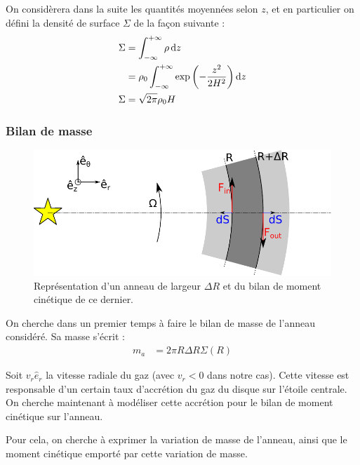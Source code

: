 \bigskip

On considèrera dans la suite les quantités moyennées selon $z$, et en particulier on défini la densité de surface $\Sigma$ de la façon suivante : 
\begin{align}
\Sigma &= \int_{-\infty}^{+\infty} \rho \dif z\nonumber\\
&=\rho_0 \int_{-\infty}^{+\infty}  \exp\left(-\frac{z^2}{2H^2}\right)\dif z\nonumber\\
\Sigma &= \sqrt{2\pi}\rho_0 H\label{eq:surface-to-volume}
\end{align}


\subsubsection{Bilan de masse}
\begin{figure}[htbp]
\centering
\includegraphics[width=0.7\linewidth]{figure/disk_ring.pdf}
\caption[Bilan de moment cinétique d'un anneau d'épaisseur $\Delta R$.]{Représentation d'un anneau de largeur $\Delta R$ et du
bilan de moment cinétique de ce dernier.}\label{fig:disk_ring}
\end{figure}

On cherche dans un premier temps à faire le bilan de masse de l'anneau considéré. Sa masse s'écrit :
\begin{align}
m_a &= 2\pi R \Delta R \Sigma(R)\label{eq:m_a}
\end{align}

\bigskip

Soit $v_r\hat{e}_r$ la vitesse radiale du gaz (avec $v_r<0$ dans notre cas). Cette vitesse est responsable d'un certain taux d'accrétion du gaz du disque sur l'étoile centrale. On cherche maintenant à modéliser cette accrétion pour le bilan de moment cinétique sur l'anneau.

Pour cela, on cherche à exprimer la variation de masse de l'anneau, ainsi que le moment cinétique emporté par cette variation de masse. 

